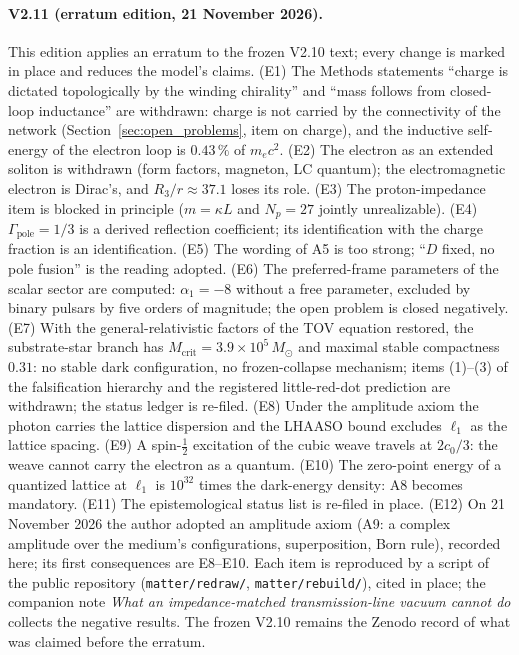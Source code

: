 \documentclass[11pt,a4paper]{article}
\theoremstyle{plain}
\theoremstyle{remark}
\begin{document}
\paragraph{V2.11 (erratum edition, 21 November 2026).} This edition applies an erratum to the frozen V2.10 text; every change is marked in place and reduces the model's claims. (E1) The Methods statements ``charge is dictated topologically by the winding chirality'' and ``mass follows from closed-loop inductance'' are withdrawn: charge is not carried by the connectivity of the network (Section~\ref{sec:open_problems}, item on charge), and the inductive self-energy of the electron loop is $0.43\,\%$ of $m_e c^2$. (E2) The electron as an extended soliton is withdrawn (form factors, magneton, LC quantum); the electromagnetic electron is Dirac's, and $R_3/r \approx 37.1$ loses its role. (E3) The proton-impedance item is blocked in principle ($m = \kappa L$ and $N_p = 27$ jointly unrealizable). (E4) $\Gamma_{\text{pole}} = 1/3$ is a derived reflection coefficient; its identification with the charge fraction is an identification. (E5) The wording of A5 is too strong; ``$D$ fixed, no pole fusion'' is the reading adopted. (E6) The preferred-frame parameters of the scalar sector are computed: $\alpha_1 = -8$ without a free parameter, excluded by binary pulsars by five orders of magnitude; the open problem is closed negatively. (E7) With the general-relativistic factors of the TOV equation restored, the substrate-star branch has $M_{\text{crit}} = 3.9\times10^{5}\,M_\odot$ and maximal stable compactness $0.31$: no stable dark configuration, no frozen-collapse mechanism; items (1)--(3) of the falsification hierarchy and the registered little-red-dot prediction are withdrawn; the status ledger is re-filed. (E8) Under the amplitude axiom the photon carries the lattice dispersion and the LHAASO bound excludes $\ell_1$ as the lattice spacing. (E9) A spin-$\tfrac12$ excitation of the cubic weave travels at $2c_0/3$: the weave cannot carry the electron as a quantum. (E10) The zero-point energy of a quantized lattice at $\ell_1$ is $10^{32}$ times the dark-energy density: A8 becomes mandatory. (E11) The epistemological status list is re-filed in place. (E12) On 21 November 2026 the author adopted an amplitude axiom (A9: a complex amplitude over the medium's configurations, superposition, Born rule), recorded here; its first consequences are E8--E10. Each item is reproduced by a script of the public repository (\texttt{matter/redraw/}, \texttt{matter/rebuild/}), cited in place; the companion note \emph{What an impedance-matched transmission-line vacuum cannot do} collects the negative results. The frozen V2.10 remains the Zenodo record of what was claimed before the erratum.
\end{document}
